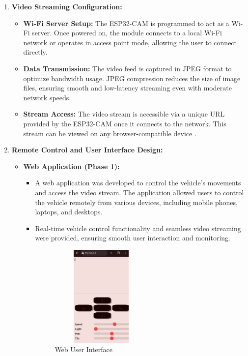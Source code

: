 \documentclass[12pt,a4paper]{report}
\begin{document}
\begin{enumerate}
    
\item \textbf{Video Streaming Configuration:}
\begin{itemize}
    \item \textbf{Wi-Fi Server Setup:} The ESP32-CAM is programmed to act as a Wi-Fi server. Once powered on, the module connects to a local Wi-Fi network or operates in access point mode, allowing the user to connect directly.
    \item \textbf{Data Transmission:} The video feed is captured in JPEG format to optimize bandwidth usage. JPEG compression reduces the size of image files, ensuring smooth and low-latency streaming even with moderate network speeds.
    \item \textbf{Stream Access:} The video stream is accessible via a unique URL provided by the ESP32-CAM once it connects to the network. This stream can be viewed on any browser-compatible device \cite{iot}.
\end{itemize}

    
\item \textbf{Remote Control and User Interface Design:}  
\begin{itemize}  
    \item \textbf{Web Application (Phase 1):}  
    \begin{itemize}  
        \item A web application was developed to control the vehicle's movements and access the video stream. The application allowed users to control the vehicle remotely from various devices, including mobile phones, laptops, and desktops.  
        \item Real-time vehicle control functionality and seamless video streaming were provided, ensuring smooth user interaction and monitoring.  
        
\begin{figure}[H]
    \centering
    \begin{minipage}{0.45\textwidth}
        \centering
        \includegraphics[width=5cm, height=5cm]{webUI}  %
        \caption{Web User Interface}
        \label{fig:webUI}
    \end{minipage} \hfill
\end{figure}
        

\end{itemize}
\end{itemize}
\end{enumerate}
\end{document}
